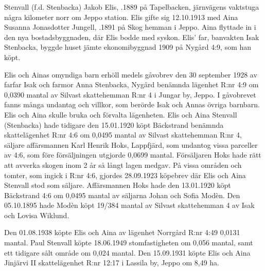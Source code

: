 Stenvall (f.d. Stenbacka) Jakob Elis, .1889 på Tapelbacken, järnvägens vaktstuga några kilometer norr om Jeppo station. Elis gifte sig 12.10.1913 med Aina Susanna Jonasdotter Jungell, .1891 på Skog hemman i Jeppo. Aina flyttade in i den nya bostadsbyggnaden, där Elis bodde med syskon.  Elis' far, banvakten Isak Stenbacka, byggde huset jämte ekonomibyggnad 1909 på Nygård 4:9, som han köpt.
\begin{jhchildren}
  \item {}
  \item {}
  \item {}
  \item {}
  \item {}
  \item {}
\end{jhchildren}
Elis och Ainas omyndiga barn erhöll medels gåvobrev den 30 september 1928 av farfar Isak och farmor Anna Stenbacka, Nygård benämnda lägenhet R:nr 4:9 om 0,0390 mantal av Silvast skattehemman R:nr 4 i Jungar by, Jeppo. I gåvobrevet fanns många undantag och villkor, som berörde Isak och Annas övriga barnbarn. Elis och Aina skulle bruka och förvalta lägenheten. Elis och Aina Stenvall (Stenbacka) hade tidigare den 15.01.1920 köpt Bäckstrand benämnda skattelägenhet R:nr 4:6 om 0,0495 mantal av Silvast skattehemman R:nr 4, säljare affärsmannen Karl Henrik Hoks, Lappfjärd, som undantog vissa parceller av 4:6, som före försäljningen utgjorde 0,0699 mantal. Försäljaren Hoks hade rätt att avverka skogen inom 2 år så långt lagen medgav. På vissa områden och tomter, som ingick i R:nr 4:6, gjordes 28.09.1923 köpebrev där Elis och Aina Stenvall stod som säljare. Affärsmannen Hoks hade den 13.01.1920 köpt Bäckstrand 4:6 om 0,0495 mantal av säljarna Johan och Sofia Modèn. Den 05.10.1895 hade Modèn köpt 19/384 mantal av Silvast skattehemman 4 av Isak och Lovisa Wiklund.

Den 01.08.1938 köpte Elis och Aina av lägenhet Norrgård R:nr 4:49  0,0131 mantal. Paul Stenvall köpte 18.06.1949 stomfastigheten om 0,056 mantal, samt ett tidigare sålt område om 0,024 mantal. Den 15.09.1931 köpte Elis och Aina Jinjärvi II skattelägenhet R:nr 12:17 i Lassila by, Jeppo om 8,49 ha.

